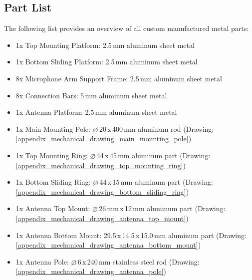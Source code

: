 \subsection{Part List}
The following list provides an overview of all custom manufactured metal parts:
\begin{itemize}
	\item 1x Top Mounting Platform: 2.5\,mm aluminum sheet metal
	\item 1x Bottom Sliding Platform: 2.5\,mm aluminum sheet metal
	\item 8x Microphone Arm Support Frame: 2.5\,mm aluminum sheet metal
	\item 8x Connection Bars: 5\,mm aluminum sheet metal
	\item 1x Antenna Platform: 2.5\,mm aluminum sheet metal
	\item 1x Main Mounting Pole: $\varnothing$\,20\,x\,400\,mm aluminum rod (Drawing: \ref{appendix_mechanical_drawing_main_mounting_pole})
	\item 1x Top Mounting Ring: $\varnothing$\,44\,x\,45\,mm aluminum part (Drawing: \ref{appendix_mechanical_drawing_top_mounting_ring})
	\item 1x Bottom Sliding Ring: $\varnothing$\,44\,x\,15\,mm aluminum part (Drawing: \ref{appendix_mechanical_drawing_bottom_sliding_ring})
	\item 1x Antenna Top Mount: $\varnothing$\,26\,mm\,x\,12\,mm aluminum part (Drawing: \ref{appendix_mechanical_drawing_antenna_top_mount})
	\item 1x Antenna Bottom Mount: 29.5\,x\,14.5\,x\,15.0\,mm aluminum part (Drawing: \ref{appendix_mechanical_drawing_antenna_bottom_mount})
	\item 1x Antenna Pole: $\varnothing$\,6\,x\,240\,mm stainless steel rod (Drawing: \ref{appendix_mechanical_drawing_antenna_pole})
\end{itemize}

